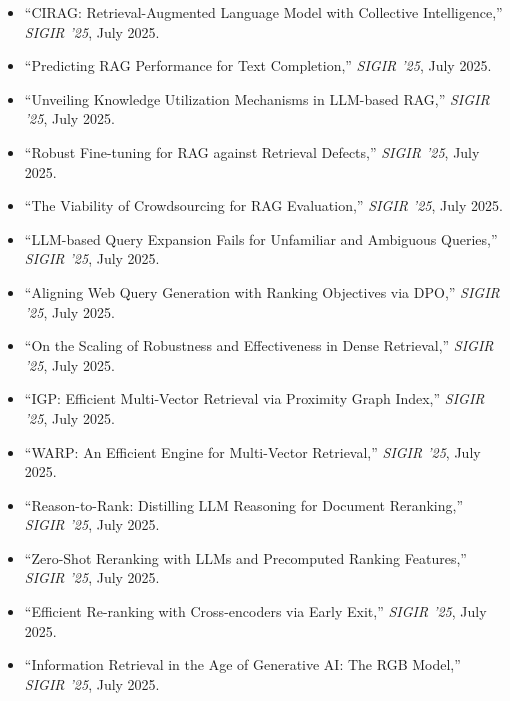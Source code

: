 \documentclass[11pt,letterpaper]{article}
\begin{document}
\begin{itemize}[leftmargin=*]
    \item ``CIRAG: Retrieval-Augmented Language Model with Collective Intelligence,'' \textit{SIGIR '25}, July 2025.

    \item ``Predicting RAG Performance for Text Completion,'' \textit{SIGIR '25}, July 2025.

    \item ``Unveiling Knowledge Utilization Mechanisms in LLM-based RAG,'' \textit{SIGIR '25}, July 2025.

    \item ``Robust Fine-tuning for RAG against Retrieval Defects,'' \textit{SIGIR '25}, July 2025.

    \item ``The Viability of Crowdsourcing for RAG Evaluation,'' \textit{SIGIR '25}, July 2025.

    \item ``LLM-based Query Expansion Fails for Unfamiliar and Ambiguous Queries,'' \textit{SIGIR '25}, July 2025.

    \item ``Aligning Web Query Generation with Ranking Objectives via DPO,'' \textit{SIGIR '25}, July 2025.

    \item ``On the Scaling of Robustness and Effectiveness in Dense Retrieval,'' \textit{SIGIR '25}, July 2025.

    \item ``IGP: Efficient Multi-Vector Retrieval via Proximity Graph Index,'' \textit{SIGIR '25}, July 2025.

    \item ``WARP: An Efficient Engine for Multi-Vector Retrieval,'' \textit{SIGIR '25}, July 2025.

    \item ``Reason-to-Rank: Distilling LLM Reasoning for Document Reranking,'' \textit{SIGIR '25}, July 2025.

    \item ``Zero-Shot Reranking with LLMs and Precomputed Ranking Features,'' \textit{SIGIR '25}, July 2025.

    \item ``Efficient Re-ranking with Cross-encoders via Early Exit,'' \textit{SIGIR '25}, July 2025.

    \item ``Information Retrieval in the Age of Generative AI: The RGB Model,'' \textit{SIGIR '25}, July 2025.


\end{itemize}
\end{document}
